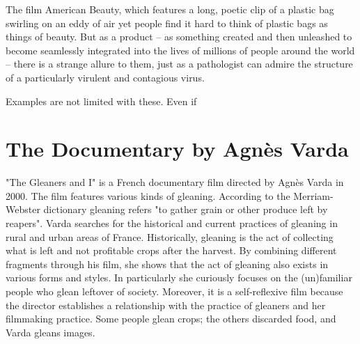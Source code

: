 

The film American Beauty, which features a long, poetic clip of a plastic bag swirling on an eddy of air yet people find it hard to think of plastic bags as things of beauty. But as a product -- as something created and then unleashed to become seamlessly integrated into the lives of millions of people around the world -- there is a strange allure to them, just as a pathologist can admire the structure of a particularly virulent and contagious virus.

Examples are not limited with these. Even if 





%
%
\section{The Documentary  by Agnès Varda}
"The Gleaners and I" is a French documentary film directed by Agnès Varda in 2000. The film features various kinds of gleaning. According to the Merriam-Webster dictionary gleaning refers "to gather grain or other produce left by reapers". Varda searches for the historical and current practices of gleaning in rural and urban areas of France. Historically, gleaning is the act of collecting what is left and not profitable crops after the harvest. By combining different fragments through his film, she shows that the act of gleaning also exists in various forms and styles. In particularly she curiously focuses on the (un)familiar people who glean leftover of society. Moreover, it is a self-reflexive film because the director establishes a relationship with the practice of gleaners and her filmmaking practice. Some people glean crops; the others discarded food, and Varda gleans images.

